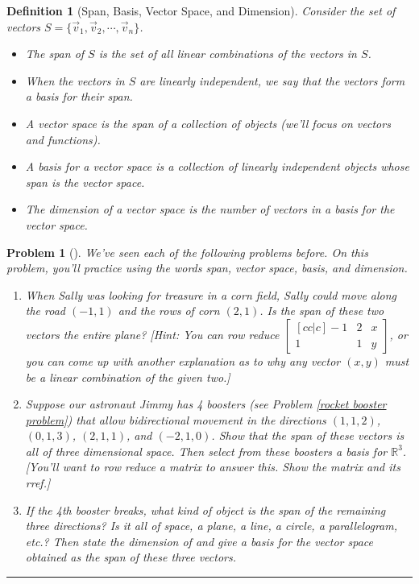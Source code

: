 \documentclass[letterpaper,oneside]{book}%
\theoremstyle{plain}
\theoremstyle{box}
\newtheorem{definition}[theorem]{Definition}
\theoremstyle{problem}
\newtheorem{problemnum}{Problem}[chapter]
\newenvironment{problem}[1][]{\begin{problemnum}[#1]}{\end{problemnum}\nopagebreak\hrule\bigskip}
\newcommand{\bvec}[1]{\begin{bmatrix} #1 \end{bmatrix}}
\begin{document}
\begin{definition}[Span, Basis, Vector Space, and Dimension]\label{definition span, vector space, dimension}
Consider the set of vectors $S = \{\vec v_1,\vec v_2,\cdots, \vec v_n\}$. 
\begin{itemize}
 \item  
The span of $S$ is the set of all linear combinations of the vectors in $S$. 
 \item 
When the vectors in $S$ are linearly independent, we say that the vectors form a basis for their span.   
 \item 
A vector space is the span of a collection of objects (we'll focus on vectors and functions).  
 \item 
A basis for a vector space is a collection of linearly independent objects whose span is the vector space. 
 \item 
The dimension of a vector space is the number of vectors in a basis for the vector space.
\end{itemize}
\end{definition}




\begin{problem}
We've seen each of the following problems before. On this problem, you'll practice using the words span, vector space, basis, and dimension. 
\begin{enumerate}
 \item When Sally was looking for treasure in a corn field, Sally could move along the road $(-1,1)$ and the rows of corn $(2,1)$. Is the span of these two vectors the entire plane? [Hint: You can row reduce $\bvec{[cc|c]-1&2&x\\1&1&y}$, or you can come up with another explanation as to why any vector $(x,y)$ must be a linear combination of the given two.] 
 \item Suppose our astronaut Jimmy has 4 boosters (see Problem \ref{rocket booster problem}) that allow bidirectional movement in the directions $(1,1,2)$, $(0,1,3)$, $(2,1,1)$, and $(-2,1,0)$. Show that the span of these vectors is all of three dimensional space. Then select from these boosters a basis for $\mathbb{R}^3$. [You'll want to row reduce a matrix to answer this. Show the matrix and its rref.]
 \item If the 4th booster breaks, what kind of object is the span of the remaining three directions? Is it all of space, a plane, a line, a circle, a parallelogram, etc.?  Then state the dimension of and give a basis for the vector space obtained as the span of these three vectors.
\end{enumerate}
\end{problem}
\end{document}
